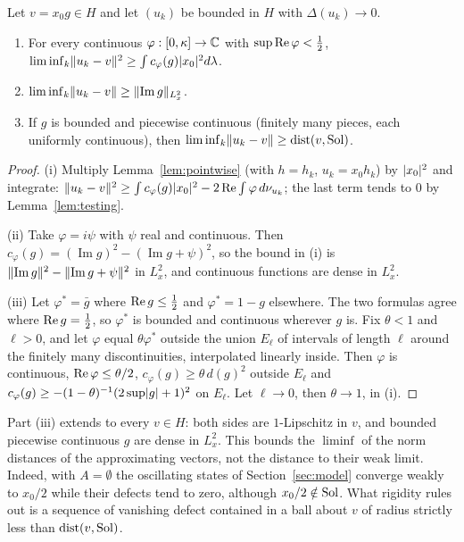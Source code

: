 \begin{theorem}[Rigidity]\label{thm:rigidity}\stproved{}
Let $v=x_0g\in H$ and let $(u_k)$ be bounded in $H$ with $\Delta(u_k)\to0$.
\begin{enumerate}[label=(\roman*)]
\item For every continuous $\varphi:[0,\kappa]\to\mathbb{C}$ with $\sup\operatorname{Re}\varphi<\frac12$,
\ $\liminf_k\lVert u_k-v\rVert^2\ge\int c_\varphi(g)\lvert x_0\rvert^2d\lambda$.
\item $\liminf_k\lVert u_k-v\rVert\ge\lVert \operatorname{Im}g\rVert_{L^2_x}$.
\item If $g$ is bounded and piecewise continuous (finitely many pieces, each uniformly
continuous), then $\liminf_k\lVert u_k-v\rVert\ge\operatorname{dist}(v,\operatorname{Sol})$.
\end{enumerate}
\end{theorem}
\begin{proof}
(i) Multiply Lemma~\ref{lem:pointwise} (with $h=h_k$, $u_k=x_0h_k$) by $\lvert x_0\rvert^2$ and
integrate: $\lVert u_k-v\rVert^2\ge\int c_\varphi(g)\lvert x_0\rvert^2-2\operatorname{Re}\int\varphi\,d\nu_{u_k}$; the last
term tends to $0$ by Lemma~\ref{lem:testing}.

(ii) Take $\varphi=i\psi$ with $\psi$ real and continuous. Then
$c_\varphi(g)=(\operatorname{Im}g)^2-(\operatorname{Im}g+\psi)^2$, so the bound in (i) is
$\lVert \operatorname{Im}g\rVert^2-\lVert \operatorname{Im}g+\psi\rVert^2$ in $L^2_x$, and continuous
functions are dense in $L^2_x$.

(iii) Let $\varphi^*=\bar g$ where $\operatorname{Re} g\le\frac12$ and $\varphi^*=1-g$ elsewhere. The two
formulas agree where $\operatorname{Re} g=\frac12$, so $\varphi^*$ is bounded and continuous wherever $g$ is.
Fix $\theta<1$ and $\ell>0$, and let $\varphi$ equal $\theta\varphi^*$ outside the union
$E_\ell$ of intervals of length $\ell$ around the finitely many discontinuities, interpolated
linearly inside. Then $\varphi$ is continuous, $\operatorname{Re}\varphi\le\theta/2$,
$c_\varphi(g)\ge\theta\,d(g)^2$ outside $E_\ell$ and
$c_\varphi(g)\ge-(1-\theta)^{-1}(2\sup\lvert g\rvert+1)^2$ on $E_\ell$. Let $\ell\to0$, then
$\theta\to1$, in (i).
\end{proof}

Part (iii) extends to every $v\in H$: both sides are $1$-Lipschitz in $v$, and bounded piecewise
continuous $g$ are dense in $L^2_x$.
This bounds the $\liminf$ of the norm distances of the approximating vectors, not the
distance to their weak limit. Indeed, with $A=\emptyset$ the oscillating states of
Section~\ref{sec:model} converge weakly to $x_0/2$ while their defects tend to zero, although
$x_0/2\notin\operatorname{Sol}$. What rigidity rules out is a sequence of vanishing defect contained
in a ball about $v$ of radius strictly less than $\operatorname{dist}(v,\operatorname{Sol})$.

